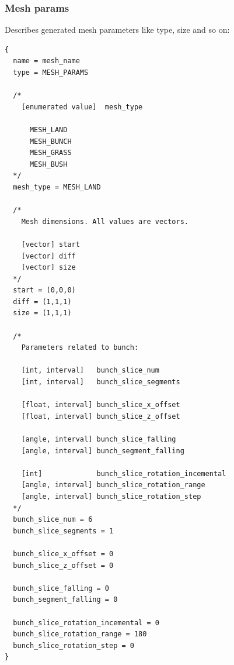 \documentclass[9pt]{article}
\begin{document}
\subsubsection{Mesh params}
Describes generated mesh parameters like type, size and so on:
\begin{verbatim}
{
  name = mesh_name
  type = MESH_PARAMS

  /*
    [enumerated value]  mesh_type
   
      MESH_LAND
      MESH_BUNCH
      MESH_GRASS
      MESH_BUSH
  */
  mesh_type = MESH_LAND
  
  /*
    Mesh dimensions. All values are vectors.
  
    [vector] start
    [vector] diff
    [vector] size
  */  
  start = (0,0,0)
  diff = (1,1,1)
  size = (1,1,1)
  
  /*
    Parameters related to bunch:
    
    [int, interval]   bunch_slice_num
    [int, interval]   bunch_slice_segments
      
    [float, interval] bunch_slice_x_offset
    [float, interval] bunch_slice_z_offset
      
    [angle, interval] bunch_slice_falling
    [angle, interval] bunch_segment_falling
        
    [int]             bunch_slice_rotation_incemental
    [angle, interval] bunch_slice_rotation_range
    [angle, interval] bunch_slice_rotation_step
  */    
  bunch_slice_num = 6
  bunch_slice_segments = 1
  
  bunch_slice_x_offset = 0
  bunch_slice_z_offset = 0
  
  bunch_slice_falling = 0
  bunch_segment_falling = 0
  
  bunch_slice_rotation_incemental = 0
  bunch_slice_rotation_range = 180
  bunch_slice_rotation_step = 0
}
\end{verbatim}
\end{document}
